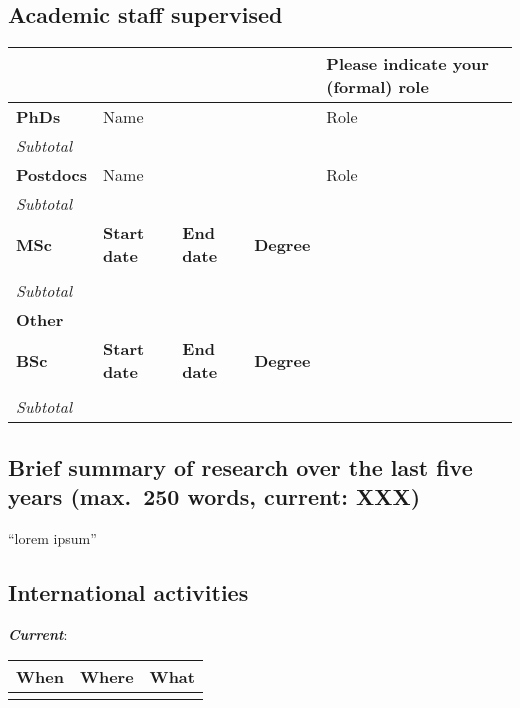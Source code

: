 \subsection{Academic staff supervised}

\begin{table}[h!] \flushleft
\begin{tabular}{p{6em}p{5em}p{5em}p{5em}p{15em}}
\hline
\T\B&&&&\textbf{Please indicate your (formal) role}\\
\hline

\T \textbf{PhDs}&\multicolumn{3}{p{15em}}{Name}&Role\\

\B \emph{Subtotal}&&&&\emph{}\\

\hline

\T\B \textbf{Postdocs}&\multicolumn{3}{p{17em}}{Name}&Role\\
\T\B \emph{Subtotal}&&&&\emph{}\\

\hline

\T \textbf{MSc}&\textbf{Start date}&\textbf{End date}&\textbf{Degree}\\
\T &&&&\\

\T\B \emph{Subtotal} &&&&\emph{}\\

\hline \T\B \textbf{Other}\\
\T\textbf{BSc}&\textbf{Start date}&\textbf{End date}&\textbf{Degree}\\
&&&&\\
\T\B \emph{Subtotal}&&&&\emph{}\\
\hline
\end{tabular}
\end{table}

\subsection{Brief summary of research over the last five years
\textnormal{(max.\ 250 words, current: XXX)}}

``lorem ipsum''

\subsection{International activities}\label{sec:internatact}

\noindent\textbf{\textit{Current}}:

\begin{table}[h!]
\begin{tabular}{p{5em}p{5em}p{28em}}
\hline
\T\B\textbf{When}&\textbf{Where}&\textbf{What}\\
\hline

\T&&\\

\hline

\end{tabular}
\end{table}


